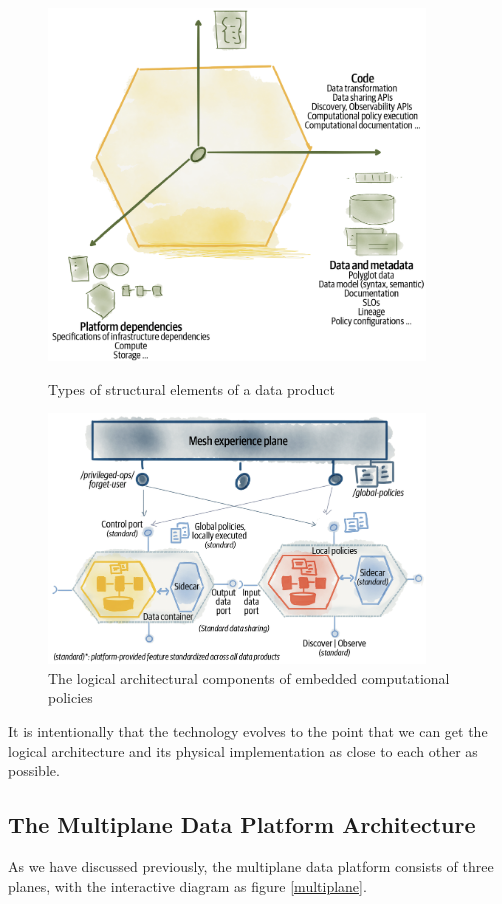 \documentclass[12pt, a4paper]{book}
\begin{document}
\begin{figure}[h]
	\begin{framed}
		\centering
		\includegraphics[width=10cm]{StructuralElements.png}
		\caption{Types of structural elements of a data product}
		\label{StructuralElements}
	\end{framed}
	\begin{framed}
		\centering
		\includegraphics[width=10cm]{LogicalComponents.png}
		\caption{The logical architectural components of embedded computational policies}
		\label{LogicalComponents}
	\end{framed}
\end{figure}

It is intentionally that the technology evolves to the point that we can get the logical architecture and its physical implementation as close to each other as possible. \cite{datamesh2022p3}


\subsection{The Multiplane Data Platform Architecture}
As we have discussed previously, the multiplane data platform consists of three planes, with the interactive diagram as figure \ref{multiplane}.
\end{document}
